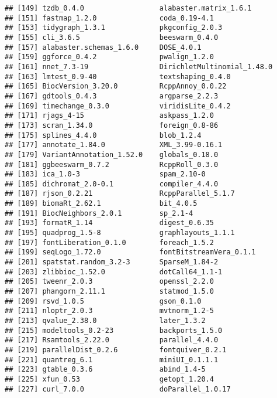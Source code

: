 \documentclass[
  11pt,
  a4paper,
]{article}
\begin{document}
\begin{verbatim}
## [149] tzdb_0.4.0                  alabaster.matrix_1.6.1     
## [151] fastmap_1.2.0               coda_0.19-4.1              
## [153] tidygraph_1.3.1             pkgconfig_2.0.3            
## [155] cli_3.6.5                   beeswarm_0.4.0             
## [157] alabaster.schemas_1.6.0     DOSE_4.0.1                 
## [159] ggforce_0.4.2               pwalign_1.2.0              
## [161] nnet_7.3-19                 DirichletMultinomial_1.48.0
## [163] lmtest_0.9-40               textshaping_0.4.0          
## [165] BiocVersion_3.20.0          RcppAnnoy_0.0.22           
## [167] gdtools_0.4.3               argparse_2.2.3             
## [169] timechange_0.3.0            viridisLite_0.4.2          
## [171] rjags_4-15                  askpass_1.2.0              
## [173] scran_1.34.0                foreign_0.8-86             
## [175] splines_4.4.0               blob_1.2.4                 
## [177] annotate_1.84.0             XML_3.99-0.16.1            
## [179] VariantAnnotation_1.52.0    globals_0.18.0             
## [181] ggbeeswarm_0.7.2            RcppRoll_0.3.0             
## [183] ica_1.0-3                   spam_2.10-0                
## [185] dichromat_2.0-0.1           compiler_4.4.0             
## [187] rjson_0.2.21                RcppParallel_5.1.7         
## [189] biomaRt_2.62.1              bit_4.0.5                  
## [191] BiocNeighbors_2.0.1         sp_2.1-4                   
## [193] formatR_1.14                digest_0.6.35              
## [195] quadprog_1.5-8              graphlayouts_1.1.1         
## [197] fontLiberation_0.1.0        foreach_1.5.2              
## [199] seqLogo_1.72.0              fontBitstreamVera_0.1.1    
## [201] spatstat.random_3.2-3       SparseM_1.84-2             
## [203] zlibbioc_1.52.0             dotCall64_1.1-1            
## [205] tweenr_2.0.3                openssl_2.2.0              
## [207] phangorn_2.11.1             statmod_1.5.0              
## [209] rsvd_1.0.5                  gson_0.1.0                 
## [211] nloptr_2.0.3                mvtnorm_1.2-5              
## [213] qvalue_2.38.0               later_1.3.2                
## [215] modeltools_0.2-23           backports_1.5.0            
## [217] Rsamtools_2.22.0            parallel_4.4.0             
## [219] parallelDist_0.2.6          fontquiver_0.2.1           
## [221] quantreg_6.1                miniUI_0.1.1.1             
## [223] gtable_0.3.6                abind_1.4-5                
## [225] xfun_0.53                   getopt_1.20.4              
## [227] curl_7.0.0                  doParallel_1.0.17          

\end{verbatim}
\end{document}
